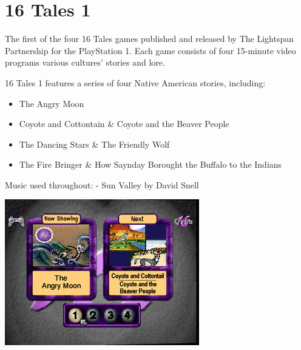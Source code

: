 \chapter{16 Tales 1}

The first of the four 16 Tales games published and released by The Lightspan Partnership for the PlayStation 1. Each game consists of four 15-minute video programs various cultures' stories and lore.

16 Tales 1 features a series of four Native American stories, including:
\begin{itemize}
    \item The Angry Moon %
    \item Coyote and Cottontain \& Coyote and the Beaver People
    \item The Dancing Stars \& The Friendly Wolf
    \item The Fire Bringer \& How Saynday Borought the Buffalo to the Indians
\end{itemize}

Music used throughout:
- Sun Valley by David Snell

\includegraphics[width=\textwidth]{"./16Tales1Screenshot.png"}

